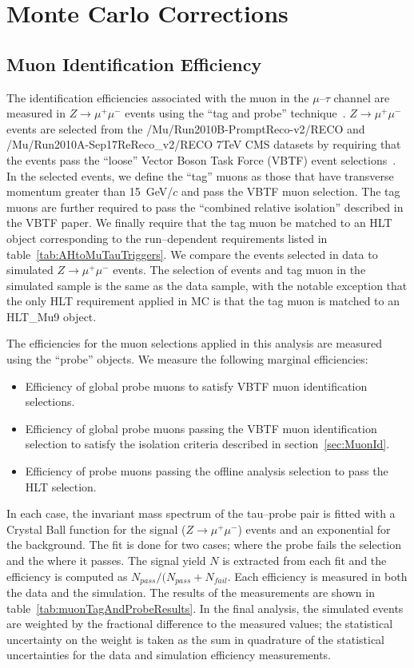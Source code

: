 \ifx\master\undefined\fi
\chapter{Monte Carlo Corrections} \label{ch:corrections} 
\section{Muon Identification Efficiency}
\label{sec:ZmumuTagAndProbe}
The identification efficiencies associated with the muon in the $\mu$--$\tau$
channel are measured in $Z\rightarrow\mu^+\mu^-$ events using the ``tag and
probe'' technique~\cite{EWK-10-002}.  $Z\rightarrow\mu^+\mu^-$ events are
selected from the \mbox{/Mu/Run2010B-PromptReco-v2/RECO} and
\mbox{/Mu/Run2010A-Sep17ReReco\_v2/RECO} 7TeV CMS datasets by requiring that the
events pass the ``loose'' Vector Boson Task Force (VBTF) event
selections~\cite{EWK-10-002}.  In the selected events, we define the ``tag''
muons as those that have transverse momentum greater than 15~GeV/$c$ and pass
the VBTF muon selection.  The tag muons are further required to pass the
``combined relative isolation'' described in the VBTF paper.  We finally require
that the tag muon be matched to an HLT object corresponding to the
run--dependent requirements listed in table~\ref{tab:AHtoMuTauTriggers}.  We
compare the events selected in data to simulated $Z\rightarrow\mu^+\mu^-$
events.  The selection of events and tag muon in the simulated sample is the
same as the data sample, with the notable exception that the only HLT
requirement applied in MC is that the tag muon is matched to an HLT\_Mu9 object.  

The efficiencies for the muon selections applied in this analysis are measured
using the ``probe'' objects.  We measure the following marginal efficiencies:
\begin{itemize}
\item Efficiency of global probe muons to satisfy VBTF muon identification
selections.
\item Efficiency of global probe muons passing the VBTF muon identification
selection to satisfy the isolation criteria described in
section~\ref{sec:MuonId}.
\item Efficiency of probe muons passing the offline analysis selection to
pass the HLT selection.
\end{itemize}

In each case, the invariant mass spectrum of the tau--probe pair is fitted with
a Crystal Ball function for the signal ($Z\rightarrow\mu^+\mu^-$) events and an
exponential for the background.  The fit is done for two cases; where the probe
fails the selection and the where it passes.  The signal yield $N$ is extracted
from each fit and the efficiency is computed as $N_{pass}/(N_{pass} + N_{fail}$.
Each efficiency is measured in both the data and the simulation. The results of
the measurements are shown in table~\ref{tab:muonTagAndProbeResults}. In the
final analysis, the simulated events are weighted by the fractional difference
to the measured values; the statistical uncertainty on the weight is taken as
the sum in quadrature of the statistical uncertainties for the data and
simulation efficiency measurements.

